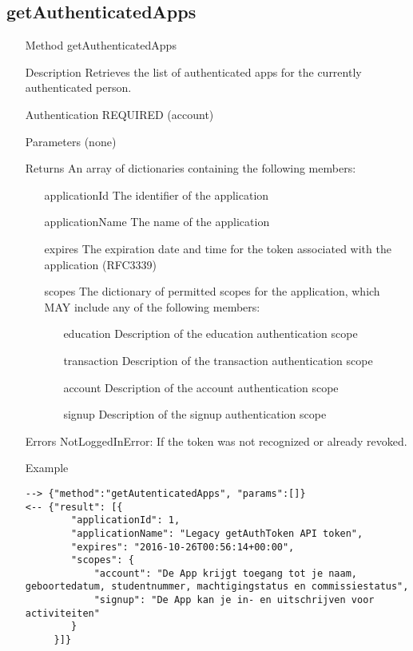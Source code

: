 \documentclass[a4paper]{scrreprt}
\begin{document}
\subsection{getAuthenticatedApps}
\begin{enumerate}
\item[Method] getAuthenticatedApps
\item[Description] Retrieves the list of authenticated apps for the currently authenticated person.
\item[Authentication] REQUIRED (account)
\item[Parameters] (none)
\item[Returns] An array of dictionaries containing the following members:
\begin{enumerate}
    \item[applicationId] The identifier of the application
    \item[applicationName] The name of the application
    \item[expires] The expiration date and time for the token associated with the application (RFC3339)
	\item[scopes] The dictionary of permitted scopes for the application, which MAY include any of the following members:
    \begin{enumerate}
        \item[education] Description of the education authentication scope
        \item[transaction] Description of the transaction authentication scope
        \item[account] Description of the account authentication scope
        \item[signup] Description of the signup authentication scope
        \end{enumerate}
    \end{enumerate}
\item[Errors] NotLoggedInError: If the token was not recognized or already revoked.
\item[Example]
\begin{lstlisting}
--> {"method":"getAutenticatedApps", "params":[]}
<-- {"result": [{
        "applicationId": 1,
        "applicationName": "Legacy getAuthToken API token",
        "expires": "2016-10-26T00:56:14+00:00",
        "scopes": {
            "account": "De App krijgt toegang tot je naam, geboortedatum, studentnummer, machtigingstatus en commissiestatus",
            "signup": "De App kan je in- en uitschrijven voor activiteiten"
        }
     }]}
\end{lstlisting}
\end{enumerate}
\end{document}

